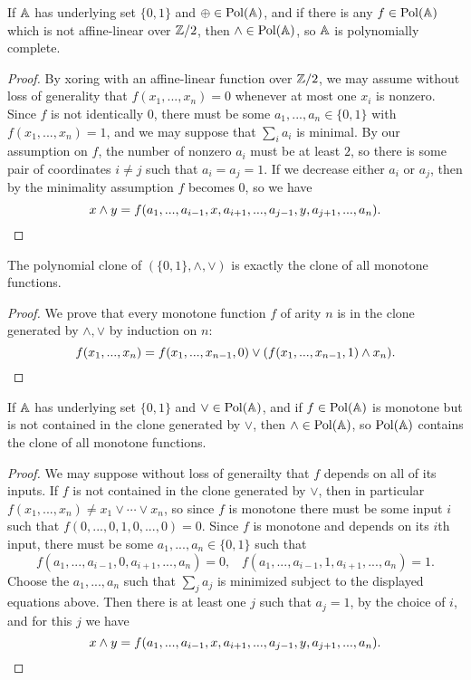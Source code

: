 \begin{appendices}
\begin{lem}\label{lem-permutational-xor} If $\mathbb{A}$ has underlying set $\{0,1\}$ and $\oplus \in \operatorname{Pol}(\mathbb{A})$, and if there is any $f \in \operatorname{Pol}(\mathbb{A})$ which is not affine-linear over $\mathbb{Z}/2$, then $\wedge \in \operatorname{Pol}(\mathbb{A})$, so $\mathbb{A}$ is polynomially complete.
\end{lem}
\begin{proof} By xoring with an affine-linear function over $\mathbb{Z}/2$, we may assume without loss of generality that $f(x_1, ..., x_n) = 0$ whenever at most one $x_i$ is nonzero. Since $f$ is not identically $0$, there must be some $a_1, ..., a_n \in \{0,1\}$ with $f(x_1, ..., x_n) = 1$, and we may suppose that $\sum_i a_i$ is minimal. By our assumption on $f$, the number of nonzero $a_i$ must be at least $2$, so there is some pair of coordinates $i\ne j$ such that $a_i = a_j = 1$. If we decrease either $a_i$ or $a_j$, then by the minimality assumption $f$ becomes $0$, so we have
\[
x \wedge y = f(a_1, ..., a_{i-1}, x, a_{i+1}, ..., a_{j-1}, y, a_{j+1}, ..., a_n).\qedhere
\]
\end{proof}

\begin{prop} The polynomial clone of $(\{0,1\}, \wedge, \vee)$ is exactly the clone of all monotone functions.
\end{prop}
\begin{proof} We prove that every monotone function $f$ of arity $n$ is in the clone generated by $\wedge, \vee$ by induction on $n$:
\[
f(x_1, ..., x_n) = f(x_1, ..., x_{n-1}, 0) \vee (f(x_1, ..., x_{n-1}, 1) \wedge x_n).\qedhere
\]
\end{proof}

\begin{lem}\label{lem-permutational-or} If $\mathbb{A}$ has underlying set $\{0,1\}$ and $\vee \in \operatorname{Pol}(\mathbb{A})$, and if $f \in \operatorname{Pol}(\mathbb{A})$ is monotone but is not contained in the clone generated by $\vee$, then $\wedge \in \operatorname{Pol}(\mathbb{A})$, so $\operatorname{Pol}(\mathbb{A})$ contains the clone of all monotone functions.
\end{lem}
\begin{proof} We may suppose without loss of generailty that $f$ depends on all of its inputs. If $f$ is not contained in the clone generated by $\vee$, then in particular $f(x_1, ..., x_n) \ne x_1 \vee \cdots \vee x_n$, so since $f$ is monotone there must be some input $i$ such that $f(0, ..., 0, 1, 0, ..., 0) = 0$. Since $f$ is monotone and depends on its $i$th input, there must be some $a_1, ..., a_n \in \{0,1\}$ such that
\[
f(a_1, ..., a_{i-1}, 0, a_{i+1}, ..., a_n) = 0, \;\;\; f(a_1, ..., a_{i-1}, 1, a_{i+1}, ..., a_n) = 1.
\]
Choose the $a_1, ..., a_n$ such that $\sum_j a_j$ is minimized subject to the displayed equations above. Then there is at least one $j$ such that $a_j = 1$, by the choice of $i$, and for this $j$ we have
\[
x \wedge y = f(a_1, ..., a_{i-1}, x, a_{i+1}, ..., a_{j-1}, y, a_{j+1}, ..., a_n).\qedhere
\]
\end{proof}


\end{appendices}
